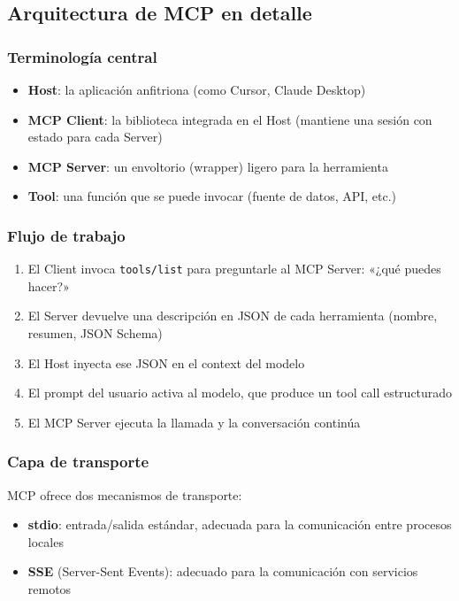 \documentclass[a4paper]{article}
\begin{document}
\subsection{Arquitectura de MCP en detalle}

\subsubsection{Terminología central}

\begin{itemize}
    \item \textbf{Host}: la aplicación anfitriona (como Cursor, Claude Desktop)
    \item \textbf{MCP Client}: la biblioteca integrada en el Host (mantiene una sesión con estado para cada Server)
    \item \textbf{MCP Server}: un envoltorio (wrapper) ligero para la herramienta
    \item \textbf{Tool}: una función que se puede invocar (fuente de datos, API, etc.)
\end{itemize}

\subsubsection{Flujo de trabajo}

\begin{enumerate}
    \item El Client invoca \texttt{tools/list} para preguntarle al MCP Server: «¿qué puedes hacer?»
    \item El Server devuelve una descripción en JSON de cada herramienta (nombre, resumen, JSON Schema)
    \item El Host inyecta ese JSON en el context del modelo
    \item El prompt del usuario activa al modelo, que produce un tool call estructurado
    \item El MCP Server ejecuta la llamada y la conversación continúa
\end{enumerate}

\subsubsection{Capa de transporte}

MCP ofrece dos mecanismos de transporte:
\begin{itemize}
    \item \textbf{stdio}: entrada/salida estándar, adecuada para la comunicación entre procesos locales
    \item \textbf{SSE} (Server-Sent Events): adecuado para la comunicación con servicios remotos
\end{itemize}
\end{document}
